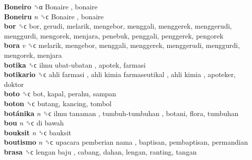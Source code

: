 \textbf{Boneiro} ␝α   Bonaire , bonaire  \\
\textbf{Boneiru} \emph{n}  ␝ϲ   Bonaire , bonaire  \\
\textbf{bor} ␝ϲ  bor, gerudi, melarik, mengebor, menggali, menggerek, menggerudi, menggurdi, mengorek, menjara, penebuk, penggali, penggerek, pengorek  \\
\textbf{bora} \emph{v}  ␝ϲ  melarik, mengebor, menggali, menggerek, menggerudi, menggurdi, mengorek, menjara  \\
\textbf{botika} ␝ϲ   ilmu ubat-ubatan , apotek, farmasi  \\
\textbf{botikario} ␝ϲ   ahli farmasi ,  ahli kimia farmaseutikal ,  ahli kimia , apoteker, doktor  \\
\textbf{boto} ␝ϲ  bot, kapal, perahu, sampan  \\
\textbf{boton} ␝ϲ  butang, kancing, tombol  \\
\textbf{botánika} \emph{n}  ␝ϲ   ilmu tanaman ,  tumbuh-tumbuhan , botani, flora, tumbuhan  \\
\textbf{bou} \emph{n}  ␝ϲ   di bawah   \\
\textbf{bouksit} \emph{n}  ␝ϲ  bauksit  \\
\textbf{boutismo} \emph{n}  ␝ϲ   upacara pemberian nama , baptisan, pembaptisan, permandian  \\
\textbf{brasa} ␝ϲ   lengan baju , cabang, dahan, lengan, ranting, tangan  \\
